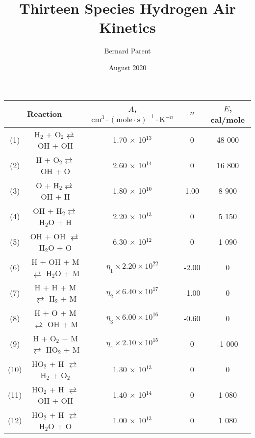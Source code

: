 \documentclass{warpdoc}
\author{
  Bernard Parent 
}
\title{Thirteen Species Hydrogen Air  Kinetics 
}
\date{
  August 2020
}
\renewcommand{\fontsizetable}{\footnotesize\scalefont{0.9}}
\begin{document}
  \pagestyle{headings}
  \setcounter{page}{1}
  \makewarpdoctitle







%
\begin{table}[t]
\fontsizetable
\begin{center}
\begin{threeparttable}
\begin{tabular}{ccccc} 
\toprule
\multicolumn{2}{c}{Reaction\tnote{a,b}} & $A$, $\textrm{cm}^3\cdot(\textrm{mole}\cdot \textrm{s})^{-1}\cdot \textrm{K}^{-n}$ & $n$ & $E$, cal/mole  \\ 
\midrule
(1) & H$_{2}$ + O$_{2} \rightleftarrows$ OH + OH & 1.70 $\times$ 10$^{13}$ & 0 & 48 000 \\
(2) & H + O$_{2} \rightleftarrows$ OH + O & 2.60 $\times$ 10$^{14}$ & 0 & 16 800 \\
(3) & O + H$_{2} \rightleftarrows$ OH + H & 1.80 $\times$ 10$^{10}$ & 1.00 & 8 900 \\
(4) & OH + H$_{2} \rightleftarrows$ H$_{2}$O + H & 2.20 $\times$ 10$^{13}$ & 0 & 5 150 \\
(5) & OH + OH $\rightleftarrows$ H$_{2}$O + O & 6.30 $\times$ 10$^{12}$ & 0 & 1 090 \\
(6) & H + OH + M $\rightleftarrows$ H$_{2}$O + M & $\eta_1 \times 2.20 \times 10^{22}$ & -2.00 & 0 \\
(7) & H + H + M $\rightleftarrows$ H$_{2}$ + M & $\eta_2 \times 6.40 \times 10^{17}$ & -1.00 & 0 \\
(8) & H + O + M $\rightleftarrows$ OH + M & $\eta_3 \times 6.00 \times 10^{16}$ & -0.60 & 0 \\
(9) & H + O$_{2}$ + M $\rightleftarrows$ HO$_{2}$ + M & $\eta_4 \times 2.10 \times 10^{15}$ & 0 & -1 000 \\
(10) & HO$_{2}$ + H $\rightleftarrows$ H$_{2}$ + O$_{2}$ & 1.30 $\times$ 10$^{13}$ & 0 & 0 \\
(11) & HO$_{2}$ + H $\rightleftarrows$ OH + OH & 1.40 $\times$ 10$^{14}$ & 0 & 1 080 \\
(12) & HO$_{2}$ + H $\rightleftarrows$ H$_{2}$O + O & 1.00 $\times$ 10$^{13}$ & 0 & 1 080 \\

\end{tabular}
\end{threeparttable}
\end{center}
\end{table}
\end{document}
